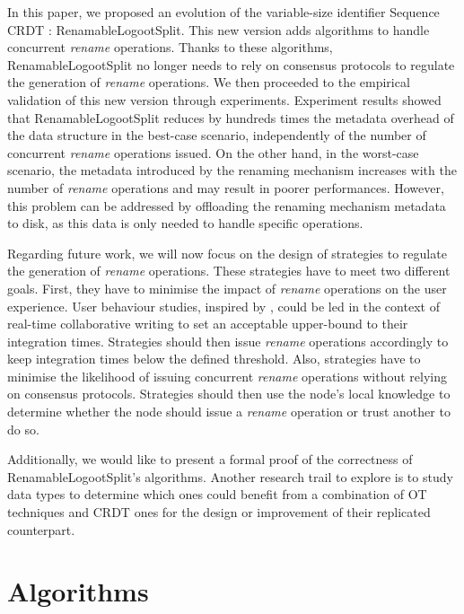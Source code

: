\documentclass[sigplan,10pt]{acmart}
\begin{document}
In this paper, we proposed an evolution of the variable-size identifier Sequence \ac{CRDT} : RenamableLogootSplit.
This new version adds algorithms to handle concurrent \emph{rename} operations.
Thanks to these algorithms, RenamableLogootSplit no longer needs to rely on consensus protocols to regulate the generation of \emph{rename} operations.
We then proceeded to the empirical validation of this new version through experiments.
Experiment results showed that RenamableLogootSplit reduces by hundreds times the metadata overhead of the data structure in the best-case scenario, independently of the number of concurrent \emph{rename} operations issued.
On the other hand, in the worst-case scenario, the metadata introduced by the renaming mechanism increases with the number of \emph{rename} operations and may result in poorer performances.
However, this problem can be addressed by offloading the renaming mechanism metadata to disk, as this data is only needed to handle specific operations.

Regarding future work, we will now focus on the design of strategies to regulate the generation of \emph{rename} operations.
These strategies have to meet two different goals.
First, they have to minimise the impact of \emph{rename} operations on the user experience.
User behaviour studies, inspired by \cite{ignat:hal-01088815,ignat:hal-01238831}, could be led in the context of real-time collaborative writing to set an acceptable upper-bound to their integration times.
Strategies should then issue \emph{rename} operations accordingly to keep integration times below the defined threshold.
Also, strategies have to minimise the likelihood of issuing concurrent \emph{rename} operations without relying on consensus protocols.
Strategies should then use the node's local knowledge to determine whether the node should issue a \emph{rename} operation or trust another to do so.

Additionally, we would like to present a formal proof of the correctness of RenamableLogootSplit's algorithms.
Another research trail to explore is to study data types to determine which ones could benefit from a combination of \ac{OT} techniques and \ac{CRDT} ones for the design or improvement of their replicated counterpart.

\appendix

\section{Algorithms}
\end{document}
